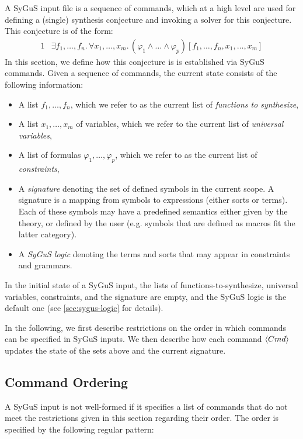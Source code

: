 \documentclass[english,a4paper,10pt]{article}
\begin{document}
A SyGuS input file is a sequence of commands,
which at a high level
are used for defining a (single) synthesis conjecture
and invoking a solver for this conjecture.
This conjecture is of the form:
\begin{alignat*}{1}
 & \exists f_1,\ldots,f_n.\, \forall x_1,\ldots,x_m.\,(\varphi_1 \wedge \ldots \wedge \varphi_p )[f_1,\ldots,f_n,x_1,\ldots,x_m]
\end{alignat*}
In this section, we define how this conjecture is
is established via SyGuS commands.
Given a sequence of commands, the current state consists of the following
information:
\begin{itemize}
\item A list
$f_1, \ldots, f_n$, which we refer to
as the current list of \emph{functions to synthesize},
\item A list 
$x_1, \ldots, x_m$ of variables, 
which we refer to the current list of \emph{universal variables}, 
\item A list of formulas
$\varphi_1, \ldots, \varphi_p$,
which we refer to as the current list of \emph{constraints},
\item A \emph{signature}
denoting the set of defined symbols in the current scope.
A signature is 
a mapping from symbols to expressions (either sorts or terms).
Each of these symbols may have a predefined semantics
either given by the theory,
or defined by the user (e.g. symbols that are defined as macros
fit the latter category).
\item A \emph{SyGuS logic} denoting the
terms and sorts that may appear in constraints and grammars.
\end{itemize}
In the initial state of a SyGuS input,
the lists of functions-to-synthesize, 
universal variables, constraints, and the signature are empty,
and the SyGuS logic is the default one 
(see \cref{sec:sygus-logic} for details).

In the following, we first describe restrictions
on the order in which commands can be specified in SyGuS inputs.
We then describe how each command $\left\langle Cmd\right\rangle$ updates
the state of the sets above and the current signature.

\subsection{Command Ordering}
A SyGuS input is not well-formed
if it specifies a list of commands that do not meet
the restrictions given in this section regarding their order. The
order is specified by the following regular pattern:
\end{document}
